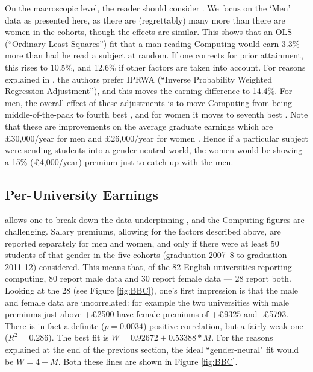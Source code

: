 \documentclass[sigconf,anonymous]{acmart}
\begin{document}
On the macroscopic level, the reader should consider \cite[Table
5]{DfE2018d}. We focus on the `Men' data as presented here, as there
are (regrettably) many more than there are women in the cohorts,
though the effects are similar. This shows that an OLS (``Ordinary
Least Squares'') fit that a man reading Computing would earn
3.3\% more than had he read a subject at random. If one corrects for
prior attainment, this rises to 10.5\%, and 12.6\% if other factors
are taken into account. For reasons explained in
\cite[\S4.2]{DfE2018d}, the authors prefer IPRWA (``Inverse
Probability Weighted Regression Adjustment''), and this moves the
earning difference to 14.4\%. For men, the overall effect of these
adjustments is to move Computing from being middle-of-the-pack
\cite[Figure 15]{DfE2018d} to fourth best \cite[Figure 17]{DfE2018d},
and for women it moves to seventh best \cite[Figure
16]{DfE2018d}. Note that these are improvements on the average
graduate earnings which are \pounds30,000/year for men and
\pounds26,000/year for women \cite[p. 37]{DfE2018d}. Hence if a
particular subject were sending students into a gender-neutral world,
the women would be showing a 15\% (\pounds4,000/year) premium just to
catch up with the men.

\subsection{Per-University Earnings}

\cite{BBC2018f} allows one to break down the data underpinning
\cite{DfE2018d}, and the Computing figures are challenging.  Salary
premiums, allowing for the factors described above, are reported
separately for men and women, and only if there were at least 50
students of that gender in the five cohorts (graduation 2007--8 to
graduation 2011-12) considered. This means that, of the 82 English
universities reporting computing, 80 report male data and 30 report
female data --- 28 report both. Looking at the 28 (see Figure
\ref{fig:BBC}), one's first impression is that the male and female
data are uncorrelated: for example the two universities with male
premiums just above +\pounds2500 have female premiums of +\pounds9325
and -\pounds5793. There is in fact a definite ($p=0.0034$) positive
correlation, but a fairly weak one ($R^2=0.286$). The best fit is
$W=0.92672+0.53388*M$. For the reasons explained at the end of the
previous section, the ideal ``gender-neural" fit would be
$W=4+M$. Both these lines are shown in Figure \ref{fig:BBC}.
\end{document}
